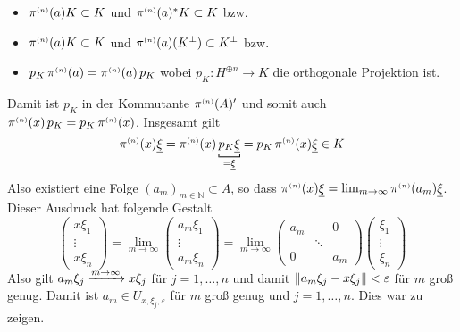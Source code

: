 \begin{beweis}
	\begin{itemize}[itemsep=3pt]
		\item $\pi^\ssbrace{n}(a) K \subset K$ und $\pi^\ssbrace{n}(a)^*K \subset K$ bzw.
		\item $\pi^\ssbrace{n}(a) K \subset K$ und $\pi^\ssbrace{n}(a)(K^\bot) \subset K^\bot$ bzw.
		\item $p_K\, \pi^\ssbrace{n}(a)= \pi^\ssbrace{n}(a)\, p_K$ wobei $p_K \colon H^{\oplus n} \to K$ die orthogonale Projektion ist.
	\end{itemize}
	Damit ist $p_K $ in der Kommutante $ \pi^\ssbrace{n}(A)'$ und somit auch $\pi^\ssbrace{n}(x)\, p_K = p_K \,\pi^\ssbrace{n}(x)$. 
	Insgesamt gilt
	\[
		\pi^\ssbrace{n}(x) \underline{\xi}=\pi^\ssbrace{n}(x)\, \Underbracket{p_K\underline{\xi}}{=\underline{\xi}} = p_K \,\pi^\ssbrace{n}(x) \underline{\xi} \in K
	\]
	Also existiert eine Folge $(a_m)_{m \in \mathbb{N}} \subset A$, so dass $\pi^\ssbrace{n}(x) \underline{\xi} = \lim_{m\to \infty} \pi^\ssbrace{n}(a_m) \underline{\xi}$.
	Dieser Ausdruck hat folgende Gestalt
	\[
		\begin{pmatrix}
			x \xi_1 \\ \vdots \\ x \xi_n 
		\end{pmatrix}
		= \lim_{m \to \infty}
		\begin{pmatrix}
			a_m \xi_1 \\ \vdots \\ a_m \xi_n
		\end{pmatrix}
		= \lim_{m \to \infty}
		\begin{pmatrix}
			a_m & & 0 \\
			& \ddots & \\
			0 & & a_m
		\end{pmatrix}
		\begin{pmatrix}
			\xi_1 \\ \vdots \\ \xi_n
		\end{pmatrix}
	\]
	Also gilt $a_m \xi_j \grenzw{m \to \infty} x \xi_j$ für $j=1,\ldots ,n$ und damit $\norm*{a_m \xi_j - x \xi_j} < \varepsilon$ für $m$ groß genug. 
	Damit ist $a_m \in U_{x,\xi_j,\varepsilon}$ für $m$ groß genug und $j=1,\ldots ,n$.
	Dies war zu zeigen.
\end{beweis}

